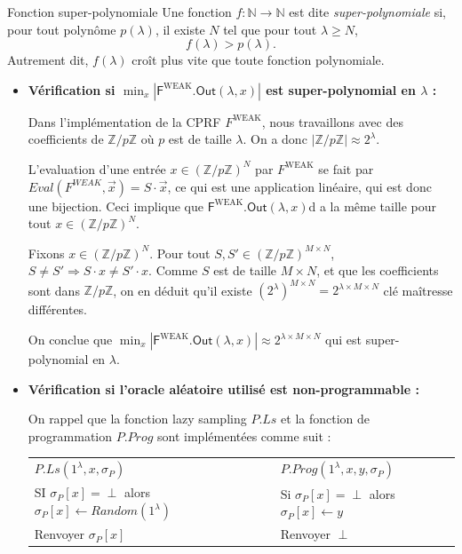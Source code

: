 \documentclass[9pt]{extarticle}
\begin{document}
\begin{defbox}{Fonction super-polynomiale}
Une fonction $f : \mathbb{N} \rightarrow \mathbb{N}$ est dite \emph{super-polynomiale} si, pour tout polynôme $p(\lambda)$, il existe $N$ tel que pour tout $\lambda \geq N$,
\[
f(\lambda) > p(\lambda).
\]
Autrement dit, $f(\lambda)$ croît plus vite que toute fonction polynomiale.
\end{defbox}

\begin{itemize}
\item \textbf{Vérification si $\min_x |\textsf{F}^{\text{WEAK}}\textsf{.Out}(\lambda, x)|$ est super-polynomial en $\lambda$ :}

Dans l'implémentation de la CPRF $F^{\text{WEAK}}$, nous travaillons avec des coefficients de $\mathbb{Z}/p\mathbb{Z}$ où $p$ est de taille $\lambda$. On a donc $|\mathbb{Z}/p\mathbb{Z}| \approx 2^{\lambda}$.

L'evaluation d'une entrée $x \in (\mathbb{Z}/p\mathbb{Z})^N$ par $F^{\text{WEAK}}$ se fait par $Eval(F^{WEAK},\vec{x}) = S \cdot \vec{x}$, ce qui est une application linéaire, qui est donc une bijection. Ceci implique que $\textsf{F}^{\text{WEAK}}\textsf{.Out}(\lambda, x)$d a la même taille pour tout $x \in (\mathbb{Z}/p\mathbb{Z})^N$.

Fixons $x \in (\mathbb{Z}/p\mathbb{Z})^N$. Pour tout $S,S' \in (\mathbb{Z}/p\mathbb{Z})^{M \times N}$, $S \neq S' \Rightarrow S \cdot x \neq S' \cdot x$. Comme $S$ est de taille $M \times N$, et que les coefficients sont dans $\mathbb{Z}/p\mathbb{Z}$, on en déduit qu'il existe  $(2^{\lambda})^{M \times N} = 2^{\lambda \times M \times N}$ clé maîtresse différentes.

On conclue que $\min_x |\textsf{F}^{\text{WEAK}}\textsf{.Out}(\lambda, x)| \approx 2^{\lambda \times M \times N}$ qui est super-polynomial en $\lambda$.

\item \textbf{Vérification si l'oracle aléatoire utilisé est non-programmable :}

On rappel que la fonction lazy sampling $P.Ls$ et la fonction de programmation $P.Prog$ sont implémentées comme suit :



\begin{center}
  \begin{tabular}{l|l}
    \textbf{\underline{$P.Ls(1^{\lambda}, x, \sigma_P)$}} & \textbf{\underline{$P.Prog(1^{\lambda}, x, y, \sigma_P)$}} \\
    SI $\sigma_P[x] = \perp$ alors $\sigma_P[x] \leftarrow Random(1^{\lambda})$ & Si $\sigma_P[x] = \perp$ alors $\sigma_P[x] \leftarrow y$ \\
    Renvoyer $\sigma_P[x]$ & Renvoyer $\perp$
  \end{tabular}
\end{center}


\end{itemize}
\end{document}
